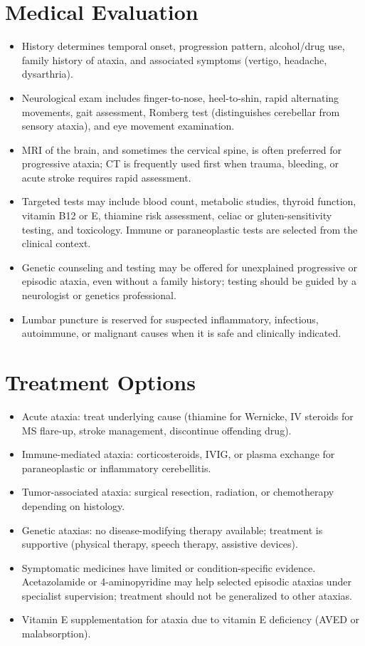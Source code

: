 \section*{Medical Evaluation}
\begin{itemize}
 \item History determines temporal onset, progression pattern, alcohol/drug use, family history of ataxia, and associated symptoms (vertigo, headache, dysarthria).
 \item Neurological exam includes finger-to-nose, heel-to-shin, rapid alternating movements, gait assessment, Romberg test (distinguishes cerebellar from sensory ataxia), and eye movement examination.
 \item MRI of the brain, and sometimes the cervical spine, is often preferred for progressive ataxia; CT is frequently used first when trauma, bleeding, or acute stroke requires rapid assessment.
 \item Targeted tests may include blood count, metabolic studies, thyroid function, vitamin B12 or E, thiamine risk assessment, celiac or gluten-sensitivity testing, and toxicology. Immune or paraneoplastic tests are selected from the clinical context.
 \item Genetic counseling and testing may be offered for unexplained progressive or episodic ataxia, even without a family history; testing should be guided by a neurologist or genetics professional.
 \item Lumbar puncture is reserved for suspected inflammatory, infectious, autoimmune, or malignant causes when it is safe and clinically indicated.
\end{itemize}

\section*{Treatment Options}
\begin{itemize}
 \item Acute ataxia: treat underlying cause (thiamine for Wernicke, IV steroids for MS flare-up, stroke management, discontinue offending drug).
 \item Immune-mediated ataxia: corticosteroids, IVIG, or plasma exchange for paraneoplastic or inflammatory cerebellitis.
 \item Tumor-associated ataxia: surgical resection, radiation, or chemotherapy depending on histology.
 \item Genetic ataxias: no disease-modifying therapy available; treatment is supportive (physical therapy, speech therapy, assistive devices).
 \item Symptomatic medicines have limited or condition-specific evidence. Acetazolamide or 4-aminopyridine may help selected episodic ataxias under specialist supervision; treatment should not be generalized to other ataxias.
 \item Vitamin E supplementation for ataxia due to vitamin E deficiency (AVED or malabsorption).
\end{itemize}

